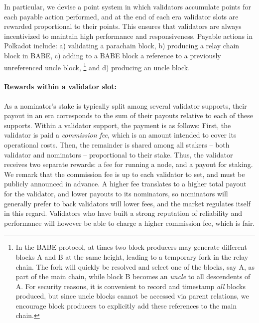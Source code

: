 In particular, we devise a point system in which validators accumulate points for each payable action performed, 
and at the end of each era validator slots are rewarded proportional to their points. 
This ensures that validators are always incentivized to maintain high performance and responsiveness. 
Payable actions in Polkadot include: a) validating a parachain block, 
b) producing a relay chain block in BABE, 
c) adding to a BABE block a reference to a previously unreferenced uncle block,%
\footnote{In the BABE protocol, at times two block producers may generate different blocks A and B at the same height, leading to a temporary fork in the relay chain. The fork will quickly be resolved and select one of the blocks, say A, as part of the main chain, while block B becomes an \emph{uncle} to all descendents of A. For security reasons, it is convenient to record and timestamp \emph{all} blocks produced, but since uncle blocks cannot be accessed via parent relations, we encourage block producers to explicitly add these references to the main chain.}
 and d) producing an uncle block.

\paragraph{Rewards within a validator slot:} As a nominator's stake is typically split among several validator supports, 
their payout in an era corresponds to the sum of their payouts relative to each of these supports. 
Within a validator support, the payment is as follows: 
First, the validator is paid a \emph{commission fee}, which is an amount intended to cover its operational costs. 
Then, the remainder is shared among all stakers -- both validator and nominators -- proportional to their stake. 
Thus, the validator receives two separate rewards: a fee for running a node, and a payout for staking. 
We remark that the commission fee is up to each validator to set, and must be publicly announced in advance. 
A higher fee translates to a higher total payout for the validator, and lower payouts to its nominators, 
so nominators will generally prefer to back validators will lower fees, and the market regulates itself in this regard. 
Validators who have built a strong reputation of reliability and performance 
will however be able to charge a higher commission fee, which is fair.

\medskip

